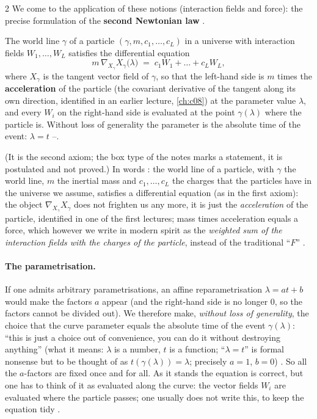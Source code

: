 \begin{paracol}{2}
We come to the application of these notions (interaction fields and force): the precise formulation of the \textbf{second Newtonian law} .

\begin{theorem}\label{ax:nd-second}
The world line $\gamma$ of a particle $(\gamma,m,c_1,\dots,c_L)$ in a universe with interaction fields $W_1,\dots,W_L$ satisfies the differential equation
\begin{equation}\label{eq:nd-second}
  m\,\nabla_{\!X_\gamma}X_\gamma\bigl(\lambda\bigr)\;=\;c_1W_1+\dots+c_LW_L ,
\end{equation}
where $X_\gamma$ is the tangent vector field of $\gamma$, so that the left-hand side is $m$ times the \textbf{acceleration} of the particle (the covariant derivative of the tangent along its own direction, identified in an earlier lecture, \cref{ch:c08}) at the parameter value $\lambda$, and every $W_i$ on the
right-hand side is evaluated at the point $\gamma(\lambda)$ where the particle is. Without loss of generality the parameter is the absolute time of the event: $\lambda=t$ --.
\end{theorem}
(It is the second axiom; the box type of the notes marks a statement, it is postulated and not proved.) In words : the world line of a particle, with $\gamma$ the world line, $m$ the inertial mass and $c_1,\dots,c_L$ the charges that the particles have in the universe we assume, satisfies a
differential equation (as in the first axiom): the object $\nabla_{X_\gamma}X_\gamma$ does not frighten us any more, it is just the \emph{acceleration} of the particle, identified in one of the first lectures; mass times acceleration equals a force, which however we write in modern spirit as the
\emph{weighted sum of the interaction fields with the charges of the particle}, instead of the traditional ``$F$'' .

\paragraph{The parametrisation.} If one admits arbitrary parametrisations, an affine reparametrisation $\lambda=at+b$ would make the factors $a$ appear (and the right-hand side is no longer $0$, so the factors cannot be divided out). We therefore make, \emph{without loss of generality}, the choice that the curve parameter
equals the absolute time of the event $\gamma(\lambda)$: ``this is just a choice out of convenience, you can do it without destroying anything'' (what it means: $\lambda$ is a number, $t$ is a function; ``$\lambda=t$'' is formal nonsense but to be thought of as $t(\gamma(\lambda))=\lambda$; precisely $a=1$, $b=0$) . So all the $a$-factors are fixed once and for all.
As it stands the equation is correct, but one has to think of it as evaluated along the curve: the vector fields $W_i$ are evaluated where the particle passes; one usually does not write this, to keep the equation tidy .


\end{paracol}
